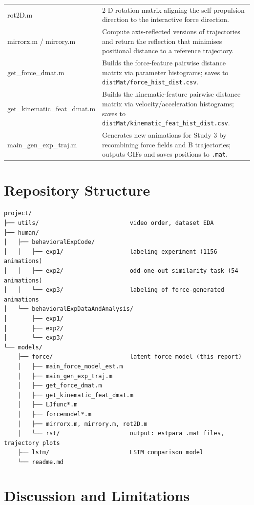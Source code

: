\documentclass[11pt,a4paper]{article}
\begin{document}
\begin{center}
\begin{tabular}{>{\ttfamily}l p{9cm}}
rot2D.m & 2-D rotation matrix aligning the self-propulsion direction to the interactive force direction. \\
mirrorx.m / mirrory.m & Compute axis-reflected versions of trajectories and return the reflection that minimises positional distance to a reference trajectory. \\
get\_force\_dmat.m & Builds the force-feature pairwise distance matrix via parameter histograms; saves to \texttt{distMat/force\_hist\_dist.csv}. \\
get\_kinematic\_feat\_dmat.m & Builds the kinematic-feature pairwise distance matrix via velocity/acceleration histograms; saves to \texttt{distMat/kinematic\_feat\_hist\_dist.csv}. \\
main\_gen\_exp\_traj.m & Generates new animations for Study 3 by recombining force fields and B trajectories; outputs GIFs and saves positions to \texttt{.mat}. \\
\bottomrule
\end{tabular}
\end{center}

\section{Repository Structure}

\begin{verbatim}
project/
├── utils/                          video order, dataset EDA
├── human/
│   ├── behavioralExpCode/
│   │   ├── exp1/                   labeling experiment (1156 animations)
│   │   ├── exp2/                   odd-one-out similarity task (54 animations)
│   │   └── exp3/                   labeling of force-generated animations
│   └── behavioralExpDataAndAnalysis/
│       ├── exp1/
│       ├── exp2/
│       └── exp3/
└── models/
    ├── force/                      latent force model (this report)
    │   ├── main_force_model_est.m
    │   ├── main_gen_exp_traj.m
    │   ├── get_force_dmat.m
    │   ├── get_kinematic_feat_dmat.m
    │   ├── LJfunc*.m
    │   ├── forcemodel*.m
    │   ├── mirrorx.m, mirrory.m, rot2D.m
    │   └── rst/                    output: estpara .mat files, trajectory plots
    ├── lstm/                       LSTM comparison model
    └── readme.md
\end{verbatim}

\section{Discussion and Limitations}
\end{document}
